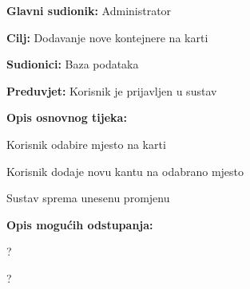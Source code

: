 				
				\noindent {}
					\begin{packed_item}
	
						\item \textbf{Glavni sudionik: }Administrator
						\item  \textbf{Cilj:} Dodavanje nove kontejnere na karti
						\item  \textbf{Sudionici:} Baza podataka
						\item  \textbf{Preduvjet:} Korisnik je prijavljen u sustav
						\item  \textbf{Opis osnovnog tijeka:}
						
						\item[] \begin{packed_enum}
	
							\item Korisnik odabire mjesto na karti
							\item Korisnik dodaje novu kantu na odabrano mjesto
							\item Sustav sprema unesenu promjenu	
						\end{packed_enum}
						
						\item  \textbf{Opis mogućih odstupanja:}
						
						\item[] \begin{packed_item}
	
							\item[2.a] ?
							
							\item[] \begin{packed_enum}
								
								\item ?
								
							\end{packed_enum}
							
							
						\end{packed_item}
					\end{packed_item}
				
